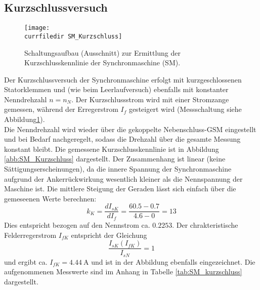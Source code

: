 \subsection{Kurzschlussversuch}
\begin{figure}
    \centering
    \texttt{[image: \\currfiledir SM\_Kurzschluss]}
    \caption{Schaltungsaufbau (Ausschnitt) zur Ermittlung der Kurzschlusskennlinie der Synchronmaschine (SM).}
    \label{fig:SM_Kurzschluss}
\end{figure}
Der Kurzschlussversuch der Synchronmaschine erfolgt mit kurzgeschlossenen Statorklemmen und (wie beim Leerlaufversuch) ebenfalls mit konstanter Nenndrehzahl $n=n_N$. Der Kurzschlussstrom wird mit einer Stromzange gemessen, während der Erregerstrom $I_f$ gesteigert wird (Messschaltung siehe Abbildung\;\ref{fig:SM_Kurzschluss}).\\
Die Nenndrehzahl wird wieder über die gekoppelte Nebenschluss-GSM eingestellt und bei Bedarf nachgeregelt, sodass die Drehzahl über die gesamte Messung konstant bleibt. Die gemessene Kurzschlusskennlinie ist in Abbildung \ref{abb:SM_Kurzschluss} dargestellt. Der Zusammenhang ist linear (keine Sättigungserscheinungen), da die innere Spannung der Synchronmaschine aufgrund der Ankerrückwirkung wesentlich kleiner als die Nennspannung der Maschine ist. Die mittlere Steigung der Geraden lässt sich einfach über die gemeseenen Werte berechnen:
\begin{equation*}
    k_K = \frac{dI_{sK}}{dI_f} = \frac{60.5 - 0.7}{4.6 - 0} = 13
\end{equation*}
Dies entspricht bezogen auf den Nennstrom ca. $0.2253$. Der chrakteristische Felderregerstrom $I_{fK}$ entspricht der Gleichung 
\begin{equation*}
    \frac{I_{sK}(I_{fK})}{I_{sN}} = 1
\end{equation*}
und ergibt ca. $I_{fK} = \SI{4.44}{\ampere}$ und ist in der Abbildung ebenfalls eingezeichnet. Die aufgenommenen Messwerte sind im Anhang in Tabelle \ref{tab:SM_kurzschluss} dargestellt.

